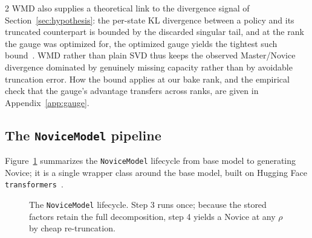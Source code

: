 \documentclass[9pt]{article}
\begin{document}
\begin{multicols}{2}
WMD also supplies a theoretical link to the divergence signal of
Section~\ref{sec:hypothesis}: the per-state KL divergence between a policy
and its truncated counterpart is bounded by the discarded singular tail, and
at the rank the gauge was optimized for, the optimized gauge yields the
tightest such bound~\citep{till2026introspection}. WMD rather than plain SVD
thus keeps the observed Master/Novice divergence dominated by genuinely
missing capacity rather than by avoidable truncation error. How the bound
applies at our bake rank, and the empirical check that the gauge's advantage
transfers across ranks, are given in Appendix~\ref{app:gauge}.

\subsection{The \texttt{NoviceModel} pipeline}

Figure~\ref{fig:pipeline} summarizes the \texttt{NoviceModel} lifecycle from
base model to generating Novice; it is a single wrapper class around the base
model, built on Hugging Face \texttt{transformers}~\citep{wolf-etal-2020-transformers}.

\begin{figure}[H]
\centering
{}
\caption{The \texttt{NoviceModel} lifecycle. Step 3 runs once; because the
stored factors retain the full decomposition, step 4 yields a Novice at any
$\rho$ by cheap re-truncation.}
\label{fig:pipeline}
\end{figure}


\end{multicols}
\end{document}
